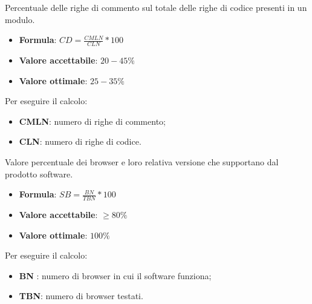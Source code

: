Percentuale delle righe di commento sul totale delle righe di codice presenti in un modulo.
\begin{itemize}
    \item \textbf{Formula}: $CD=\frac{CMLN}{CLN}*100$
    \item \textbf{Valore accettabile}: $20-45\%$
    \item \textbf{Valore ottimale}: $25-35\%$
\end{itemize}  
Per eseguire il calcolo:
\begin{itemize}
    \item \textbf{CMLN}: numero di righe di commento;
    \item \textbf{CLN}: numero di righe di codice.
\end{itemize}

Valore percentuale dei browser e loro relativa versione che supportano dal prodotto software.
\begin{itemize}
    \item \textbf{Formula}: $SB=\frac{BN}{TBN}*100$
    \item \textbf{Valore accettabile}: $\geq80\%$
    \item \textbf{Valore ottimale}: $100\%$
\end{itemize}  
Per eseguire il calcolo:
\begin{itemize}
    \item \textbf{BN} : numero di browser in cui il software funziona;
    \item \textbf{TBN}: numero di browser testati.
\end{itemize}

